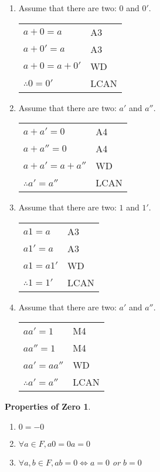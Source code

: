 \documentclass[letterpaper,12pt,fleqn]{article}
\begin{document}
\begin{theproof}
\listbreak
\begin{enumerate}
\item{Assume that there are two: $0$ and $0'$.}

\begin{tabular}{ll}
$a+0=a$ & A3 \\
$a+0'=a$ & A3 \\
$a+0=a+0'$ & WD \\
$\therefore 0=0'$ & LCAN \\
\end{tabular}

\item{Assume that there are two: $a'$ and $a''$.}

\begin{tabular}{ll}
$a+a'=0$ & A4 \\
$a+a''=0$ & A4 \\
$a+a'=a+a''$ & WD \\
$\therefore a'=a''$ & LCAN \\
\end{tabular}

\item{Assume that there are two: $1$ and $1'$.}

\begin{tabular}{ll}
$a1=a$ & A3 \\
$a1'=a$ & A3 \\
$a1=a1'$ & WD \\
$\therefore 1=1'$ & LCAN \\
\end{tabular}

\item{Assume that there are two: $a'$ and $a''$.}

\begin{tabular}{ll}
$aa'=1$ & M4 \\
$aa''=1$ & M4 \\
$aa'=aa''$ & WD \\
$\therefore a'=a''$ & LCAN \\
\end{tabular}
\end{enumerate}
\end{theproof}

\theoremstyle{mathitem}
\newtheorem*{zero}{Properties of Zero}
\begin{zero}
\listbreak
\begin{enumerate}
\item{$0=-0$}
\item{$\forall a\in F,a0=0a=0$}
\item{$\forall a,b\in F, ab=0\iff a=0$ or $b=0$}
\end{enumerate}
\end{zero}
\end{document}
